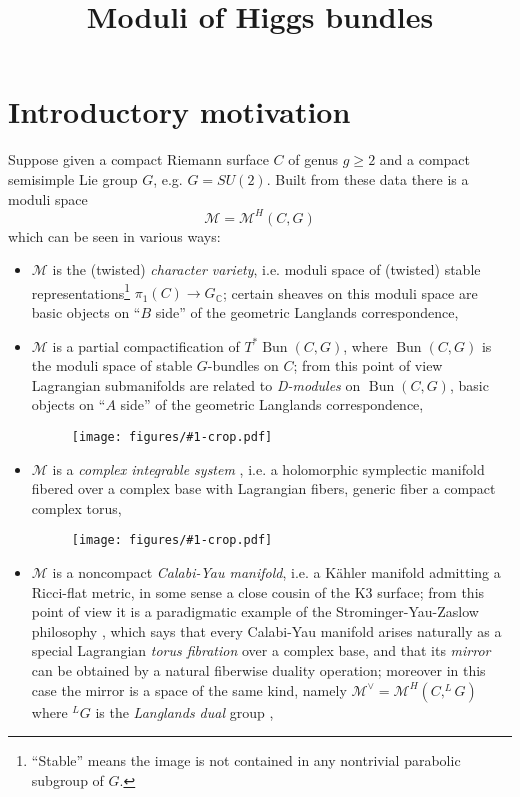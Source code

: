 \documentclass[12pt,letterpaper,reqno]{amsart}
\numberwithin{equation}{section}
\newcommand{\cM}{\ensuremath{\mathcal M}}
\newcommand{\C}{\ensuremath{\mathbb C}}
\newcommand{\kahler}{K\"ahler\xspace}
\newcommand{\ti}[1]{\textit{#1}}
\DeclareMathOperator{\Bun}{Bun}
\newcommand{\insfig}[2]{\begin{figure}[htbp] \centering \texttt{[image: figures/\#1-crop.pdf]} \label{fig:#1} \end{figure}}
\begin{document}
\title{Moduli of Higgs bundles}
\date{}

\maketitle

\setcounter{page}{1}


\section{Introductory motivation}

Suppose given a compact Riemann surface $C$
of genus $g \ge 2$ and a compact semisimple
Lie group $G$, e.g. $G = SU(2)$. Built from these data there is a
moduli space $$\cM = \cM^H(C,G)$$
which can be seen in various ways:

\begin{itemize}
\item $\cM$ is the (twisted) \ti{character variety}, i.e. moduli space of
(twisted) 
stable representations\footnote{``Stable'' means the image is not
contained in any nontrivial parabolic subgroup of $G$.}
$\pi_1(C) \to G_\C$; certain sheaves on this moduli space are 
basic objects on ``$B$ side'' of the geometric Langlands correspondence,
\item $\cM$ is a partial compactification of $T^* \Bun(C,G)$, where $\Bun(C,G)$ is the moduli space of stable $G$-bundles on $C$; from this point of view Lagrangian submanifolds are related to \ti{D-modules} on $\Bun(C,G)$, basic objects on ``$A$ side'' 
of the geometric Langlands correspondence,
\insfig{higgs-bundles-2}{0.55}
\item $\cM$ is a \ti{complex integrable system} \cite{MR88i:58068}, i.e. a holomorphic
symplectic manifold fibered over a complex base with Lagrangian
fibers, generic fiber a compact complex torus, \insfig{higgs-bundles-1}{0.8}
\item $\cM$ is a noncompact \ti{Calabi-Yau manifold}, i.e. a \kahler
manifold admitting a Ricci-flat metric, in some sense a close 
cousin of the K3 surface; from this point of view
it is a paradigmatic example of the Strominger-Yau-Zaslow
philosophy \cite{Strominger:1996it}, 
which says that every Calabi-Yau manifold arises naturally
as a special Lagrangian \ti{torus fibration} over a complex base,
and that its \ti{mirror} can be obtained by a natural fiberwise duality
operation; moreover in this case the mirror is a space of the same kind,
namely $\cM^\vee = \cM^H(C,^L G)$ where 
$^L G$ is the \ti{Langlands dual} group \cite{mlh,MR2957305}, 

\end{itemize}
\end{document}
